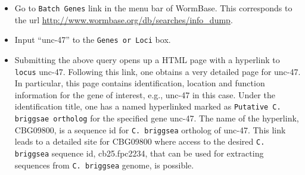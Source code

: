 \documentclass[notitlepage,11pt]{article}
\begin{document}
\begin{itemize}
\item Go to  \texttt{Batch Genes} link in the menu bar of WormBase. This
  corresponds to the url
  \url{http://www.wormbase.org/db/searches/info\_dump}.

\item Input  ``unc-47'' to the \texttt{Genes or Loci} box. 

 \item Submitting the above query opens up a HTML page with a hyperlink to
 \texttt{locus} unc-47. Following this link, one obtains a very detailed page
 for unc-47. In particular, this page contains identification,
 location and function information for the gene of interest, e.g.,
 unc-47 in this case. Under the identification title, one has a named hyperlinked  marked as 
 \texttt{Putative C. briggsae ortholog} for the specified gene unc-47.  The name of the hyperlink,  CBG09800,  is a sequence id
 for \texttt{C. briggsea} ortholog of unc-47. This link
 leads to a detailed site for CBG09800 where
 access to the desired \texttt{C. briggsea} sequence id, cb25.fpc2234, that can be used
 for extracting sequences from \texttt{C. briggsea} genome, is possible.


\end{itemize}
\end{document}
